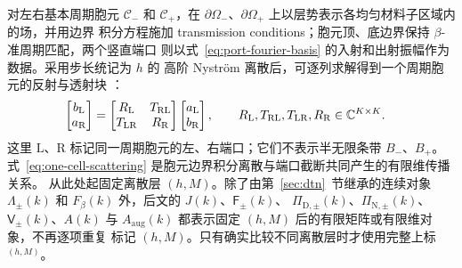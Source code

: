 对左右基本周期胞元 $\mathcal C_-$ 和 $\mathcal C_+$，在
$\partial\Omega_-$、$\partial\Omega_+$ 上以层势表示各均匀材料子区域内的场，并用边界
积分方程施加 transmission conditions；胞元顶、底边界保持 $\beta$-准周期匹配，两个竖直端口
则以式~\eqref{eq:port-fourier-basis} 的入射和出射振幅作为数据。采用步长统记为 $h$ 的
高阶 Nystr\"om 离散后，可逐列求解得到一个周期胞元的反射与透射块
\cite{LuLu2014}：
\begin{align}
  \begin{bmatrix}b_{\mathrm L}\\ a_{\mathrm R}\end{bmatrix}
  &=
  \begin{bmatrix}
    R_{\mathrm L}&T_{\mathrm{RL}}\\
    T_{\mathrm{LR}}&R_{\mathrm R}
  \end{bmatrix}
  \begin{bmatrix}a_{\mathrm L}\\ b_{\mathrm R}\end{bmatrix},
  \qquad
  R_{\mathrm L},T_{\mathrm{RL}},T_{\mathrm{LR}},R_{\mathrm R}
  \in\mathbb{C}^{K\times K}.
  \label{eq:one-cell-scattering}
\end{align}
这里 $\mathrm L$、$\mathrm R$ 标记同一周期胞元的左、右端口；它们不表示半无限条带
$B_-$、$B_+$。
式~\eqref{eq:one-cell-scattering} 是胞元边界积分离散与端口截断共同产生的有限维传播关系。
从此处起固定离散层 $(h,M)$。除了由第~\ref{sec:dtn}~节继承的连续对象
$\Lambda_\pm(k)$ 和 $F_\beta(k)$ 外，后文的 $J(k)$、$\mathsf F_\pm(k)$、
$\Pi_{\mathrm D,\pm}(k)$、$\Pi_{\mathrm N,\pm}(k)$、$\mathsf V_\pm(k)$、$A(k)$
与 $A_{\mathrm{aug}}(k)$ 都表示固定 $(h,M)$ 后的有限矩阵或有限维对象，不再逐项重复
标记 $(h,M)$。只有确实比较不同离散层时才使用完整上标 ${}^{(h,M)}$。

